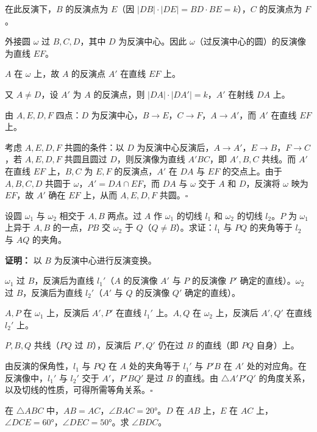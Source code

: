 \documentclass[12pt, a4paper]{ctexart}
\begin{document}
在此反演下，$B$ 的反演点为 $E$（因 $|DB| \cdot |DE| = BD \cdot BE = k$），$C$ 的反演点为 $F$。

外接圆 $\omega$ 过 $B, C, D$，其中 $D$ 为反演中心。因此 $\omega$（过反演中心的圆）的反演像为直线 $EF$。

$A$ 在 $\omega$ 上，故 $A$ 的反演点 $A'$ 在直线 $EF$ 上。

又 $A \neq D$，设 $A'$ 为 $A$ 的反演点，则 $|DA| \cdot |DA'| = k$，$A'$ 在射线 $DA$ 上。

由 $A, E, D, F$ 四点：$D$ 为反演中心，$B \to E$，$C \to F$，$A \to A'$，而 $A'$ 在直线 $EF$ 上。

考虑 $A, E, D, F$ 共圆的条件：以 $D$ 为反演中心反演后，$A \to A'$，$E \to B$，$F \to C$，若 $A, E, D, F$ 共圆且圆过 $D$，则反演像为直线 $A'BC$，即 $A', B, C$ 共线。而 $A'$ 在直线 $EF$ 上，$B, C$ 为 $E, F$ 的反演点，$A'$ 在 $DA$ 与 $EF$ 的交点上。由于 $A, B, C, D$ 共圆于 $\omega$，$A' = DA \cap EF$，而 $DA$ 与 $\omega$ 交于 $A$ 和 $D$，反演将 $\omega$ 映为 $EF$，故 $A'$ 确在 $EF$ 上，从而 $A, E, D, F$ 共圆。$\square$

\begin{examplebox}[【例题5】反演变换求角度]
设圆 $\omega_1$ 与 $\omega_2$ 相交于 $A, B$ 两点。过 $A$ 作 $\omega_1$ 的切线 $l_1$ 和 $\omega_2$ 的切线 $l_2$。$P$ 为 $\omega_1$ 上异于 $A, B$ 的一点，$PB$ 交 $\omega_2$ 于 $Q$（$Q \neq B$）。求证：$l_1$ 与 $PQ$ 的夹角等于 $l_2$ 与 $AQ$ 的夹角。
\end{examplebox}

\textbf{证明：} 以 $B$ 为反演中心进行反演变换。

$\omega_1$ 过 $B$，反演后为直线 $l_1'$（$A$ 的反演像 $A'$ 与 $P$ 的反演像 $P'$ 确定的直线）。$\omega_2$ 过 $B$，反演后为直线 $l_2'$（$A'$ 与 $Q$ 的反演像 $Q'$ 确定的直线）。

$A, P$ 在 $\omega_1$ 上，反演后 $A', P'$ 在直线 $l_1'$ 上。$A, Q$ 在 $\omega_2$ 上，反演后 $A', Q'$ 在直线 $l_2'$ 上。

$P, B, Q$ 共线（$PQ$ 过 $B$），反演后 $P', Q'$ 仍在过 $B$ 的直线（即 $PQ$ 自身）上。

由反演的保角性，$l_1$ 与 $PQ$ 在 $A$ 处的夹角等于 $l_1'$ 与 $P'B$ 在 $A'$ 处的对应角。在反演像中，$l_1'$ 与 $l_2'$ 交于 $A'$，$P'BQ'$ 是过 $B$ 的直线。由 $\triangle A'P'Q'$ 的角度关系，以及切线的性质，可得所需等角关系。$\square$

\begin{examplebox}[【例题6】位似旋转与相似三角形]
在 $\triangle ABC$ 中，$AB = AC$，$\angle BAC = 20°$。$D$ 在 $AB$ 上，$E$ 在 $AC$ 上，$\angle DCE = 60°$，$\angle DEC = 50°$。求 $\angle BDC$。
\end{examplebox}
\end{document}
